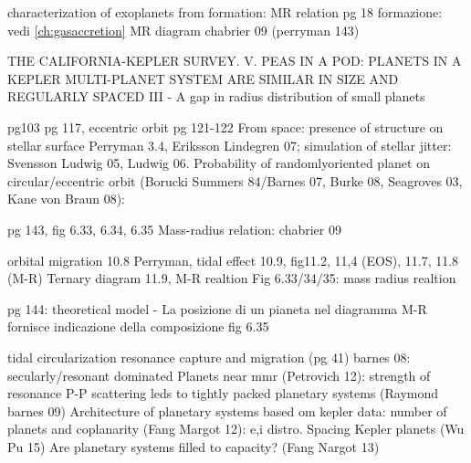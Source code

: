 \begin{workout}
characterization of exoplanets from formation: MR relation pg 18
formazione: vedi \ref{ch:gasaccretion}
MR diagram chabrier 09 (perryman 143)
\end{workout}

\begin{workout}
THE CALIFORNIA-KEPLER SURVEY. V. PEAS IN A POD: PLANETS IN A KEPLER MULTI-PLANET SYSTEM ARE SIMILAR IN SIZE AND REGULARLY SPACED
						 III - A gap in radius distribution of small planets
\end{workout}

\begin{workout}
pg103
pg 117, eccentric orbit pg 121-122
From space: presence of structure on stellar surface Perryman 3.4, Eriksson Lindegren 07; simulation of stellar jitter: Svensson Ludwig 05, Ludwig 06.
Probability of randomlyoriented planet on circular/eccentric orbit (Borucki Summers 84/Barnes 07, Burke 08,  Seagroves 03, Kane von Braun 08):
\end{workout}

\begin{workout}
pg 143, fig 6.33, 6.34, 6.35
Mass-radius relation: chabrier 09
\end{workout}

\begin{workout}[M-R diagram]
orbital migration 10.8 Perryman, tidal effect 10.9, 
fig11.2, 11,4 (EOS), 11.7, 11.8 (M-R)
Ternary diagram 11.9, M-R realtion
Fig 6.33/34/35: mass radius realtion

pg 144: theoretical model - La posizione di un pianeta nel diagramma M-R fornisce indicazione della composizione
fig 6.35
\end{workout}

\begin{workout}
\end{workout}

\begin{workout}
tidal circularization
resonance capture and migration (pg 41)
barnes 08: secularly/resonant dominated
Planets near mmr (Petrovich 12): strength of resonance
P-P scattering leds to tightly packed planetary systems (Raymond barnes 09)
Architecture of planetary systems based om kepler data: number of planets and coplanarity (Fang Margot 12): e,i distro.
Spacing Kepler planets (Wu Pu 15)
Are planetary systems filled to capacity? (Fang Nargot 13)
\end{workout}

